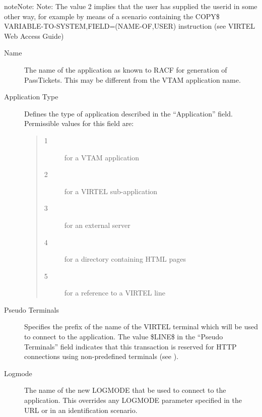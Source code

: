 \documentclass[letterpaper,10pt,english]{sphinxmanual}
\begin{document}
\begin{sphinxadmonition}{note}{Note:}
Note: The value 2 implies that the user has supplied the userid in some other way, for example by means of a scenario containing the COPY\$ VARIABLE-TO-SYSTEM,FIELD=(NAME-OF,USER) instruction (see VIRTEL Web Access Guide)
\end{sphinxadmonition}
\begin{description}
\item[{Name}] \leavevmode
The name of the application as known to RACF for generation of PassTickets. This may be different from the VTAM application name.

\item[{Application Type}] \leavevmode
Defines the type of application described in the “Application” field. Permissible values for this field are:
\begin{quote}
\begin{description}
\item[{1}] \leavevmode
for a VTAM application

\item[{2}] \leavevmode
for a VIRTEL sub-application

\item[{3}] \leavevmode
for an external server

\item[{4}] \leavevmode
for a directory containing HTML pages

\item[{5}] \leavevmode
for a reference to a VIRTEL line

\end{description}
\end{quote}

\item[{Pseudo Terminals}] \leavevmode
Specifies the prefix of the name of the VIRTEL terminal which will be used to connect to the application. The value \$LINE\$ in the “Pseudo Terminals” field indicates that this transaction is reserved for HTTP connections using non-predefined terminals (see {\hyperref[\detokenize{connectivity_guide:v457cn-forceluname}]{}}).

\item[{Logmode}] \leavevmode
The name of the new LOGMODE that  be used to connect to the application. This overrides any LOGMODE parameter specified in the URL or in an identification scenario.


\end{description}
\end{document}
